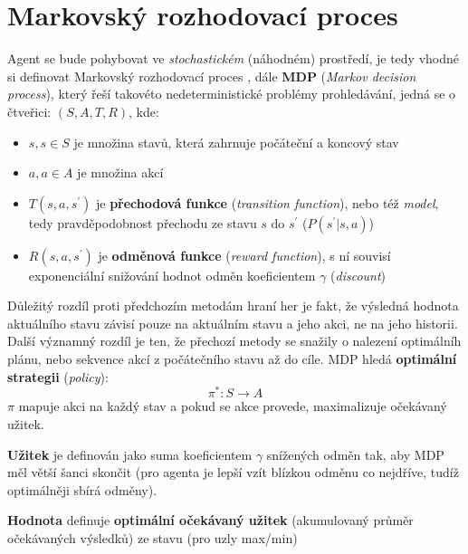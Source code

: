 \section{Markovský rozhodovací proces}
Agent se bude pohybovat ve \textit{stochastickém} (náhodném) prostředí, je tedy vhodné si definovat Markovský rozhodovací proces \cite{RLAprox}, dále \textbf{MDP} (\textit{Markov decision process}), který řeší takovéto nedeterministické problémy prohledávání, jedná se o čtveřici:
$(S,A,T,R)$, kde:
\begin{itemize}
\item $s, s \in S$ je množina stavů, která zahrnuje počáteční a koncový stav
\item $a, a \in A$ je množina akcí
\item $T(s,a,s^\prime)$ je \textbf{přechodová funkce} (\textit{transition function}), nebo též \textit{model}, tedy pravděpodobnost přechodu ze stavu $s$ do $s^\prime$ ($P(s^\prime| s, a) $)
\item $R(s,a,s^\prime)$ je  \textbf{odměnová funkce} (\textit{reward function}), s ní souvisí exponenciální snižování hodnot odměn koeficientem $\gamma$ (\textit{discount})
\end{itemize}
Důležitý rozdíl proti předchozím metodám hraní her je fakt, že výsledná hodnota aktuálního stavu závisí pouze na aktuálním stavu a jeho akci, ne na jeho historii.
Další významný rozdíl je ten, že přechozí metody se snažily o nalezení optimálníh plánu, nebo sekvence akcí z počátečního stavu až do cíle. MDP hledá \textbf{optimální strategii} (\textit{policy}):
\begin{displaymath}
\pi^*: S \to A
\end{displaymath}
$\pi$ mapuje akci na každý stav a pokud se akce provede, maximalizuje očekávaný užitek.

\textbf{Užitek} je definován jako suma koeficientem $\gamma$ snížených odměn tak, aby MDP měl větší šanci skončit (pro agenta je lepší vzít blízkou odměnu co nejdříve, tudíž optimálněji sbírá odměny).

\textbf{Hodnota} definuje \textbf{optimální očekávaný užitek} (akumulovaný průměr očekávaných výsledků) ze stavu (pro uzly max/min)

